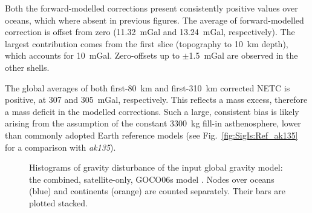 Both the forward-modelled corrections present consistently positive values over oceans, which where absent in previous figures.
The average of forward-modelled correction is offset from zero (\SI[retain-explicit-plus]{+11.32}{mGal} and \SI[retain-explicit-plus]{+13.24}{mGal}, respectively).
The largest contribution comes from the first slice (topography to \SI{10}{\kilo \metre} depth), which accounts for \SI[retain-explicit-plus]{+10}{mGal}.
Zero-offsets up to $\pm$\SI{1.5}{mGal} are observed in the other shells.



The global averages of both first-\SI{80}{\kilo \metre} and first-\SI{310}{\kilo \metre} corrected NETC is positive, at \num{307} and \SI{305}{mGal}, respectively.
This reflects a mass excess, therefore a mass deficit in the modelled corrections.
Such a large, consistent bias is likely arising from the assumption of the constant \SI{3300}{\kilo \gram} fill-in asthenosphere, lower than commonly adopted Earth reference models (see Fig.~\ref{fig:SigIs:Ref_ak135} for a comparison with \textit{ak135}).

\begin{figure}
    \begin{adjustbox}{center}
    \end{adjustbox}
    \caption[Histogram of the disturbance from the input global gravity model.]{
        Histograms of gravity disturbance of the input global gravity model: the combined, satellite-only, GOCO06s model \parencite{Kvas_GOCO06s_dataset}.
        Nodes over oceans (blue) and continents (orange) are counted separately. Their bars are plotted stacked.
    }
    \label{fig:SigIs:Res:HistGGMin}
\end{figure}

